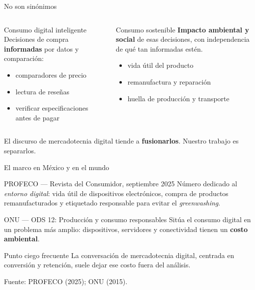 \documentclass[aspectratio=169,xcolor=dvipsnames]{beamer}
\newcommand{\fuente}[1]{{\tiny\color{IPNgris}Fuente: #1}}
\begin{document}
\begin{frame}{No son sinónimos}
\begin{columns}[T]
  \begin{block}{Consumo digital inteligente}
    Decisiones de compra \textbf{informadas} por datos y comparación:
    \begin{itemize}
      \small
      \item comparadores de precio
      \item lectura de reseñas
      \item verificar especificaciones antes de pagar
    \end{itemize}
  \end{block}
  \begin{exampleblock}{Consumo sostenible}
    \textbf{Impacto ambiental y social} de esas decisiones, con independencia de qué tan informadas estén.
    \vspace{4pt}
    \begin{itemize}
      \small
      \item vida útil del producto
      \item remanufactura y reparación
      \item huella de producción y transporte
    \end{itemize}
  \end{exampleblock}
\end{columns}
\vspace{6pt}
\begin{center}\small El discurso de mercadotecnia digital tiende a \textbf{fusionarlos}. Nuestro trabajo es separarlos.\end{center}
\end{frame}

\begin{frame}{El marco en México y en el mundo}
\small
\begin{block}{PROFECO — Revista del Consumidor, septiembre 2025}
  Número dedicado al \emph{entorno digital}: vida útil de dispositivos electrónicos, compra de productos remanufacturados y etiquetado responsable para evitar el \textit{greenwashing}.
\end{block}
\begin{block}{ONU — ODS 12: Producción y consumo responsables}
  Sitúa el consumo digital en un problema más amplio: dispositivos, servidores y conectividad tienen un \textbf{costo ambiental}.
\end{block}
\begin{alertblock}{Punto ciego frecuente}
  La conversación de mercadotecnia digital, centrada en conversión y retención, suele dejar ese costo fuera del análisis.
\end{alertblock}
\fuente{PROFECO (2025); ONU (2015).}
\end{frame}
\end{document}
